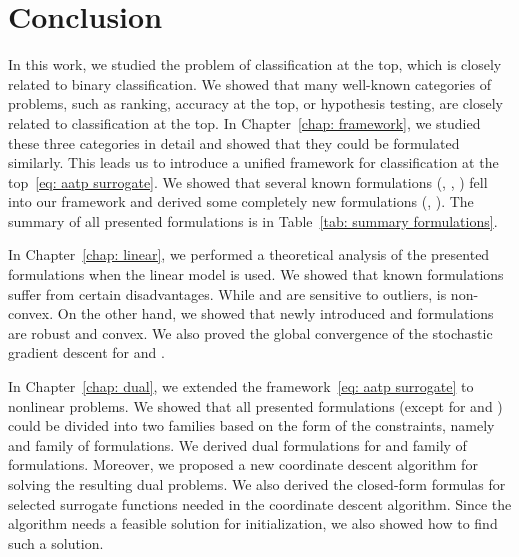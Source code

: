 \chapter*{Conclusion}

In this work, we studied the problem of classification at the top, which is closely related to binary classification. We showed that many well-known categories of problems, such as ranking, accuracy at the top, or hypothesis testing, are closely related to classification at the top. In Chapter~\ref{chap: framework}, we studied these three categories in detail and showed that they could be formulated similarly. This leads us to introduce a unified framework for classification at the top~\eqref{eq: aatp surrogate}. We showed that several known formulations (\TopPush, \Grill, \tauFPL) fell into our framework and derived some completely new formulations (\PatMat, \PatMatNP). The summary of all presented formulations is in Table~\ref{tab: summary formulations}.

In Chapter~\ref{chap: linear}, we performed a theoretical analysis of the presented formulations when the linear model is used. We showed that known formulations suffer from certain disadvantages. While \TopPush and \tauFPL are sensitive to outliers, \Grill is non-convex. On the other hand, we showed that newly introduced \PatMat and \PatMatNP formulations are robust and convex. We also proved the global convergence of the stochastic gradient descent for \PatMat and \PatMatNP.

In Chapter~\ref{chap: dual}, we extended the framework~\eqref{eq: aatp surrogate} to nonlinear problems. We showed that all presented formulations (except for \Grill and \GrillNP) could be divided into two families based on the form of the constraints, namely \TopPushK and \PatMat family of formulations. We derived dual formulations for \TopPushK and \PatMat family of formulations. Moreover, we proposed a new coordinate descent algorithm for solving the resulting dual problems. We also derived the closed-form formulas for selected surrogate functions needed in the coordinate descent algorithm. Since the algorithm needs a feasible solution for initialization, we also showed how to find such a solution.

